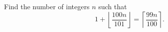 Find the number of integers $n$ such that \[1+\left\lfloor\dfrac{100n}{101}\right\rfloor=\left\lceil\dfrac{99n}{100}\right\rceil.\]
